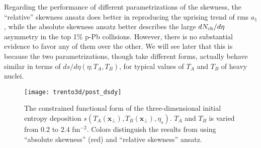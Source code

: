 Regarding the performance of different parametrizations of the skewness, the ``relative'' skewness ansatz does better in reproducing the uprising trend of rms $a_1$, while the absolute skewness ansatz better describes the large $dN_\text{ch}/d\eta$ asymmetry in the top 1\% p-Pb collisions.
However, there is no substantial evidence to favor any of them over the other.
We will see later that this is because the two parametrizations, though take different forms, actually behave similar in terms of $ds/d\eta(\eta; T_A, T_B)$, for typical values of $T_A$ and $T_B$ of heavy nuclei.

\begin{figure}
\singlespacing 
\centering
\texttt{[image: trento3d/post\_dsdy]}
\caption[The constrained functional form of the three-dimensional initial]{The constrained functional form of the three-dimensional initial entropy deposition $s(T_A(\mathbf{x}_\perp), T_B(\mathbf{x}_\perp), \eta_s)$. $T_A$ and $T_B$ is varied from $0.2$ to $2.4$ fm${}^{-2}$. Colors distinguish the results from using ``absolute skewness'' (red) and ``relative skewness'' ansatz.}
\label{fig:trento:post_dsdy}
\end{figure}

